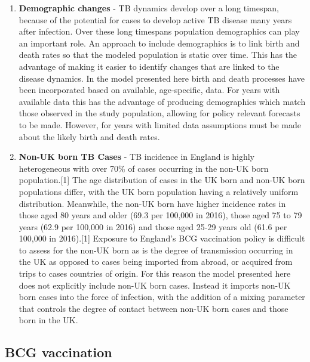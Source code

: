 \documentclass[11pt,twoside]{bristolthesis}
\begin{document}
\begin{enumerate}
  \item
    \textbf{Demographic changes} - TB dynamics develop over a long timespan, because of the potential for cases to develop active TB disease many years after infection. Over these long timespans population demographics can play an important role. An approach to include demographics is to link birth and death rates so that the modeled population is static over time. This has the advantage of making it easier to identify changes that are linked to the disease dynamics. In the model presented here birth and death processes have been incorporated based on available, age-specific, data. For years with available data this has the advantage of producing demographics which match those observed in the study population, allowing for policy relevant forecasts to be made. However, for years with limited data assumptions must be made about the likely birth and death rates.
  \item
    \textbf{Non-UK born TB Cases} - TB incidence in England is highly heterogeneous with over 70\% of cases occurring in the non-UK born population.{[}1{]} The age distribution of cases in the UK born and non-UK born populations differ, with the UK born population having a relatively uniform distribution. Meanwhile, the non-UK born have higher incidence rates in those aged 80 years and older (69.3 per 100,000 in 2016), those aged 75 to 79 years (62.9 per 100,000 in 2016) and those aged 25-29 years old (61.6 per 100,000 in 2016).{[}1{]} Exposure to England's BCG vaccination policy is difficult to assess for the non-UK born as is the degree of transmission occurring in the UK as opposed to cases being imported from abroad, or acquired from trips to cases countries of origin. For this reason the model presented here does not explicitly include non-UK born cases. Instead it imports non-UK born cases into the force of infection, with the addition of a mixing parameter that controls the degree of contact between non-UK born cases and those born in the UK.
  \end{enumerate}
  \hypertarget{bcg-vaccination}{%
  \subsection{BCG vaccination}\label{bcg-vaccination}}
  
\end{document}
